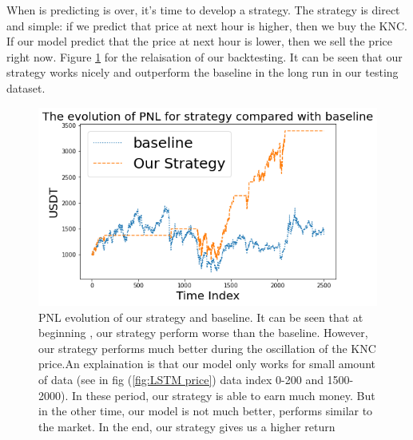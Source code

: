 \documentclass[twoside]{report}
\begin{document}
\begin{spacing}{1}
When is predicting is over, it's time to develop a strategy. The strategy is direct and simple: if we predict that price at next hour is higher, then we buy the KNC. If our model predict that the price at next hour is lower, then we sell the price right now.
Figure \ref{fig:LSTM PNL} for the relaisation of our backtesting. It can be seen that our strategy works nicely and outperform the baseline in the long run in our testing dataset. 
\begin{figure}[!htbp]
    \centering
    \includegraphics[scale = 0.7]{Images/LSTM PNL.png}
    \caption{PNL evolution of our strategy and baseline. It can be seen that at beginning , our strategy perform worse than the baseline. However, our strategy performs much better during the oscillation of the KNC price.An explaination is that our model only works for small amount of data (see in fig (\ref{fig:LSTM price}) data index 0-200 and 1500-2000). In these period, our strategy is able to earn much money. But in the other time, our model is not much better, performs similar to the market. In the end, our strategy gives us a higher return }
    \label{fig:LSTM PNL}
\end{figure}

























\end{spacing}
\end{document}
